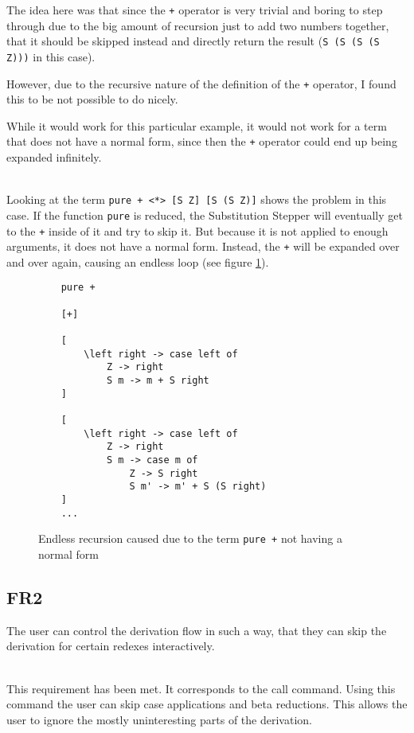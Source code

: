 The idea here was that since the \texttt{+} operator is very trivial and boring to step through due to the big amount of recursion just to add two numbers together,
that it should be skipped instead and directly return the result (\texttt{S (S (S (S Z)))} in this case).

However, due to the recursive nature of the definition of the \texttt{+} operator,
I found this to be not possible to do nicely.

While it would work for this particular example,
it would not work for a term that does not have a normal form,
since then the \texttt{+} operator could end up being expanded infinitely.

\ \\
Looking at the term \texttt{pure + <*> [S Z] [S (S Z)]} shows the problem in this case.
If the function \texttt{pure} is reduced,
the Substitution Stepper will eventually get to the \texttt{+} inside of it and try to skip it.
But because it is not applied to enough arguments,
it does not have a normal form.
Instead, the \texttt{+} will be expanded over and over again, causing an endless loop (see figure \ref*{fig:FR1infiniteLoop}).

\begin{figure}[!ht]
\begin{verbatim}
    pure +

    [+]

    [
        \left right -> case left of
            Z -> right
            S m -> m + S right
    ]

    [
        \left right -> case left of
            Z -> right
            S m -> case m of
                Z -> S right
                S m' -> m' + S (S right)
    ]
    ...
\end{verbatim}
    \caption{Endless recursion caused due to the term \texttt{pure +} not having a normal form}
    \label{fig:FR1infiniteLoop}
\end{figure}

\newpage
\subsection{FR2}
The user can control the derivation flow in such a way, that they can skip the derivation for certain redexes interactively.

\ \\
This requirement has been met.
It corresponds to the call command.
Using this command the user can skip case applications and beta reductions.
This allows the user to ignore the mostly uninteresting parts of the derivation.

